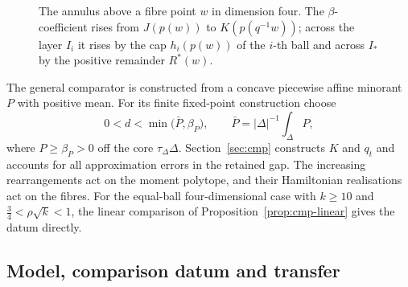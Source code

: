 \begin{figure}[ht]
\centering
{}
\caption{The annulus above a fibre point $w$ in dimension four. The $\beta$-coefficient rises from $J(p(w))$ to
$K(p(q^{-1}w))$; across the layer $I_i$ it rises by the cap $h_i(p(w))$ of the $i$-th ball and across $I_*$ by the
positive remainder $R^*(w)$.}
\label{fig:mech-layers}
\end{figure}

The general comparator is constructed from a concave piecewise affine minorant $P$ with positive mean.
For its finite fixed-point construction choose
\begin{equation}\label{eq:mech-necessary}
 0<d<\min\bigl(\bar P,\beta_P\bigr),\qquad
 \bar P=|\Delta|^{-1}\int_\Delta P,
\end{equation}
where $P\ge\beta_P>0$ off the core $\tau_\Delta\Delta$. Section~\ref{sec:cmp} constructs $K$ and $q_t$ and accounts for
all approximation errors in the retained gap. The increasing rearrangements act on the moment
polytope, and their Hamiltonian realisations act on the fibres. For the equal-ball four-dimensional
case with $k\ge10$ and $\frac34<\rho\sqrt k<1$, the linear comparison of Proposition~\ref{prop:cmp-linear} gives the datum directly.

\subsection{Model, comparison datum and transfer}\label{sec:mech-interfaces}

